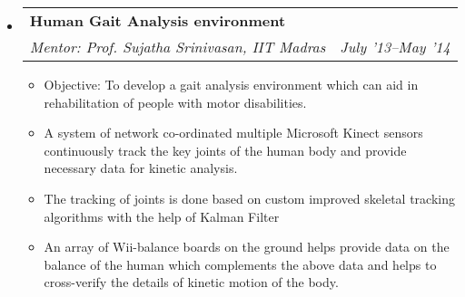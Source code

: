 \documentclass[letterpaper,10pt]{article}
\makeatletter
\newcommand{\resitem}[1]{\item #1 \vspace{-2pt}}
\newcommand{\ressubheading}[4]{
\begin{tabular*}{6.5in}[t]{l@{\cftdotfill{\cftsecdotsep}\extracolsep{\fill}}r}
		\textbf{#1} & #2 \\
		\textit{#3} & \textit{#4} \\
\end{tabular*}\vspace{-6pt}}
\makeatother
\begin{document}
\begin{itemize}
\item 
	\ressubheading{Human Gait Analysis environment}{}{Mentor: Prof. Sujatha Srinivasan, IIT Madras}{July '13--May '14}
	\begin{itemize}
		\resitem{Objective: To develop a gait analysis environment which can aid in rehabilitation of people with motor disabilities.}
		\resitem{A system of network co-ordinated multiple Microsoft Kinect sensors continuously track the key joints of the
human body and provide necessary data for kinetic analysis.}
\resitem{The tracking of joints is done based on custom improved skeletal tracking algorithms with the help of Kalman
Filter}
\resitem{An array of Wii-balance boards on the ground helps provide data on the balance of the human which
complements the above data and helps to cross-verify the details of kinetic motion of the body.}
	\end{itemize}

\end{itemize}

\vspace*{-16pt}
\end{document}
